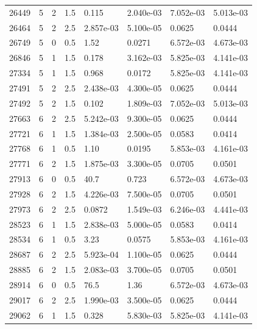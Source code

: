 \documentclass[preview]{standalone}
\begin{document}
{{{{{\begin{tabular}{L{1.2cm}C{1.2cm} C{0.3cm}C{0.5cm} C{1.4cm}C{1.4cm} C{1.4cm}C{1.4cm}}
  26449  &     5  & 2     & 1.5 &  0.115  & 2.040e-03  & 7.052e-03 &  5.013e-03   \\ 
  26464  &     5  & 2     & 2.5 &  2.857e-03  & 5.100e-05  & 0.0625 &  0.0444   \\ 
  26749  &     5  & 0     & 0.5 &  1.52  & 0.0271  & 6.572e-03 &  4.673e-03   \\ 
  26846  &     5  & 1     & 1.5 &  0.178  & 3.162e-03  & 5.825e-03 &  4.141e-03   \\ 
  27334  &     5  & 1     & 1.5 &  0.968  & 0.0172  & 5.825e-03 &  4.141e-03   \\ 
  27491  &     5  & 2     & 2.5 &  2.438e-03  & 4.300e-05  & 0.0625 &  0.0444   \\ 
  27492  &     5  & 2     & 1.5 &  0.102  & 1.809e-03  & 7.052e-03 &  5.013e-03   \\ 
  27663  &     6  & 2     & 2.5 &  5.242e-03  & 9.300e-05  & 0.0625 &  0.0444   \\ 
  27721  &     6  & 1     & 1.5 &  1.384e-03  & 2.500e-05  & 0.0583 &  0.0414   \\ 
  27768  &     6  & 1     & 0.5 &  1.10  & 0.0195  & 5.853e-03 &  4.161e-03   \\ 
  27771  &     6  & 2     & 1.5 &  1.875e-03  & 3.300e-05  & 0.0705 &  0.0501   \\ 
  27913  &     6  & 0     & 0.5 &  40.7  & 0.723  & 6.572e-03 &  4.673e-03   \\ 
  27928  &     6  & 2     & 1.5 &  4.226e-03  & 7.500e-05  & 0.0705 &  0.0501   \\ 
  27973  &     6  & 2     & 2.5 &  0.0872  & 1.549e-03  & 6.246e-03 &  4.441e-03   \\ 
  28523  &     6  & 1     & 1.5 &  2.838e-03  & 5.000e-05  & 0.0583 &  0.0414   \\ 
  28534  &     6  & 1     & 0.5 &  3.23  & 0.0575  & 5.853e-03 &  4.161e-03   \\ 
  28687  &     6  & 2     & 2.5 &  5.923e-04  & 1.100e-05  & 0.0625 &  0.0444   \\ 
  28885  &     6  & 2     & 1.5 &  2.083e-03  & 3.700e-05  & 0.0705 &  0.0501   \\ 
  28914  &     6  & 0     & 0.5 &  76.5  & 1.36  & 6.572e-03 &  4.673e-03   \\ 
  29017  &     6  & 2     & 2.5 &  1.990e-03  & 3.500e-05  & 0.0625 &  0.0444   \\ 
  29062  &     6  & 1     & 1.5 &  0.328  & 5.830e-03  & 5.825e-03 &  4.141e-03   \\ 

\end{tabular}}}}}}
\end{document}

